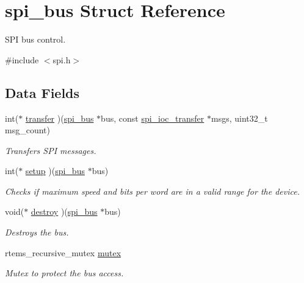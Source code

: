 \hypertarget{structspi__bus}{}\section{spi\+\_\+bus Struct Reference}
\label{structspi__bus}


S\+PI bus control.  




{\ttfamily \#include $<$spi.\+h$>$}

\subsection*{Data Fields}
\begin{DoxyCompactItemize}
\item 
int($\ast$ \mbox{\hyperlink{structspi__bus_a53a296ac6dad161c4b46e56afda399c7}{transfer}} )(\mbox{\hyperlink{structspi__bus}{spi\+\_\+bus}} $\ast$bus, const \mbox{\hyperlink{structspi__ioc__transfer}{spi\+\_\+ioc\+\_\+transfer}} $\ast$msgs, uint32\+\_\+t msg\+\_\+count)
\begin{DoxyCompactList}\small\item\em Transfers S\+PI messages. \end{DoxyCompactList}\item 
int($\ast$ \mbox{\hyperlink{structspi__bus_a73816e06bde44fbbf31b238fedc4c6d2}{setup}} )(\mbox{\hyperlink{structspi__bus}{spi\+\_\+bus}} $\ast$bus)
\begin{DoxyCompactList}\small\item\em Checks if maximum speed and bits per word are in a valid range for the device. \end{DoxyCompactList}\item 
void($\ast$ \mbox{\hyperlink{structspi__bus_a2fb539efa059a61f3f5f258dbd53f74e}{destroy}} )(\mbox{\hyperlink{structspi__bus}{spi\+\_\+bus}} $\ast$bus)
\begin{DoxyCompactList}\small\item\em Destroys the bus. \end{DoxyCompactList}\item 
\mbox{\label{structspi__bus_aa0918df9cda5b44f0f9c8c1c225a9df5}} 
rtems\+\_\+recursive\+\_\+mutex \mbox{\hyperlink{structspi__bus_aa0918df9cda5b44f0f9c8c1c225a9df5}{mutex}}
\begin{DoxyCompactList}\small\item\em Mutex to protect the bus access. \end{DoxyCompactList}\item 

\end{DoxyCompactItemize}
